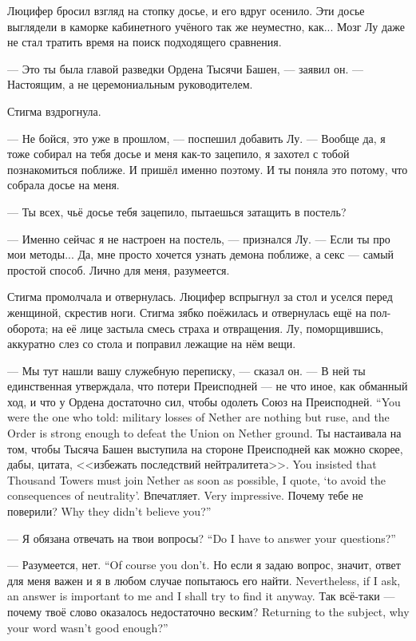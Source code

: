 Люцифер бросил взгляд на стопку досье, и его вдруг осенило.
Эти досье выглядели в каморке кабинетного учёного так же неуместно, как...
Мозг Лу даже не стал тратить время на поиск подходящего сравнения.

--- Это ты была главой разведки Ордена Тысячи Башен, --- заявил он.
--- Настоящим, а не церемониальным руководителем.

Стигма вздрогнула.

--- Не бойся, это уже в прошлом, --- поспешил добавить Лу.
--- Вообще да, я тоже собирал на тебя досье и меня как-то зацепило, я захотел с тобой познакомиться поближе.
И пришёл именно поэтому.
И ты поняла это потому, что собрала досье на меня.

--- Ты всех, чьё досье тебя зацепило, пытаешься затащить в постель?

--- Именно сейчас я не настроен на постель, --- признался Лу.
--- Если ты про мои методы...
Да, мне просто хочется узнать демона поближе, а секс --- самый простой способ.
Лично для меня, разумеется.

Стигма промолчала и отвернулась.
Люцифер вспрыгнул за стол и уселся перед женщиной, скрестив ноги.
Стигма зябко поёжилась и отвернулась ещё на пол-оборота;
на её лице застыла смесь страха и отвращения.
Лу, поморщившись, аккуратно слез со стола и поправил лежащие на нём вещи.

--- Мы тут нашли вашу служебную переписку, --- сказал он.
{--- В ней ты единственная утверждала, что потери Преисподней --- не что иное, как обманный ход, и что у Ордена достаточно сил, чтобы одолеть Союз на Преисподней.}
{``You were the one who told: military losses of Nether are nothing but ruse, and the Order is strong enough to defeat the Union on Nether ground.}
{Ты настаивала на том, чтобы Тысяча Башен выступила на стороне Преисподней как можно скорее, дабы, цитата, <<избежать последствий нейтралитета>>.}
{You insisted that Thousand Towers must join Nether as soon as possible, I quote, `to avoid the consequences of neutrality'.}
{Впечатляет.}
{Very impressive.}
{Почему тебе не поверили?}
{Why they didn't believe you?''}

{--- Я обязана отвечать на твои вопросы?}
{``Do I have to answer your questions?''}

{--- Разумеется, нет.}
{``Of course you don't.}
{Но если я задаю вопрос, значит, ответ для меня важен и я в любом случае попытаюсь его найти.}
{Nevertheless, if I ask, an answer is important to me and I shall try to find it anyway.}
{Так всё-таки --- почему твоё слово оказалось недостаточно веским?}
{Returning to the subject, why your word wasn't good enough?''}

